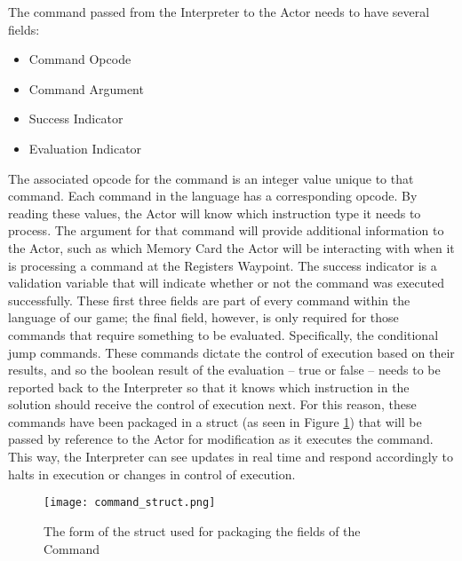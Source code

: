 The command passed from the Interpreter to the Actor needs to have several fields:
\begin{itemize}
	\item Command Opcode
	\item Command Argument
	\item Success Indicator
	\item Evaluation Indicator
\end{itemize}
The associated opcode for the command is an integer value unique to that command. Each 
command in the language has a corresponding opcode. By reading these values, the Actor 
will know which instruction type it needs to process. The argument for that command will 
provide additional information to the Actor, such as which Memory Card the Actor will be 
interacting with when it is processing a command at the Registers Waypoint. The success 
indicator is a validation variable that will indicate whether or not the command was executed 
successfully. These first three fields are part of every command within the language of our 
game; the final field, however, is only required for those commands that require something 
to be evaluated. Specifically, the conditional jump commands. These commands dictate the 
control of execution based on their results, and so the boolean result of the evaluation -- true 
or false -- needs to be reported back to the Interpreter so that it knows which instruction in 
the solution should receive the control of execution next. For this reason, these commands 
have been packaged in a struct (as seen in Figure \ref{fig:command_struct}) that will be 
passed by reference to the Actor for modification as it executes the command. This way, the
 Interpreter can see updates in real time and respond accordingly to halts in execution or 
changes in control of execution.\\

\begin{figure}[!htb]
  \caption{The form of the struct used for packaging the fields of the Command}
  \label{fig:command_struct}
  \centering
  \texttt{[image: command\_struct.png]}
\end{figure}

